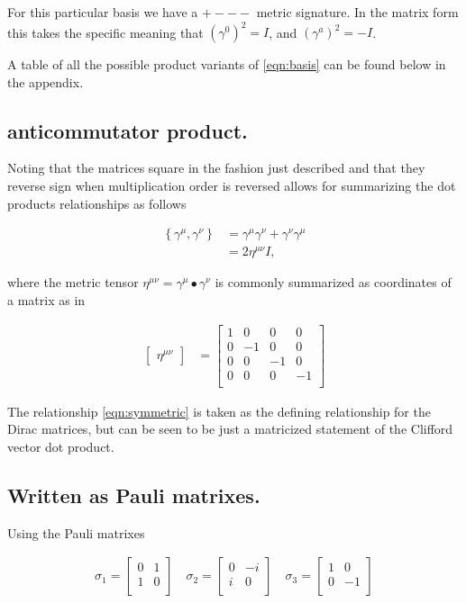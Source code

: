 \documentclass{article}
\newcommand{\scalarProduct}[2]{{#1} \bullet {#2}}
\newcommand{\symmetric}[2]{{\left\{{#1},{#2}\right\}}}
\newcommand{\PauliX}[0]{
\begin{bmatrix}
0 & 1 \\
1 & 0 \\
\end{bmatrix}
}
\newcommand{\PauliY}[0]{
\begin{bmatrix}
0 & -i \\
i & 0 \\
\end{bmatrix}
}
\newcommand{\PauliZ}[0]{
\begin{bmatrix}
1 & 0 \\
0 & -1 \\
\end{bmatrix}
}
\begin{document}
For this particular basis we have a $+---$ metric signature.  In the matrix form this takes the specific meaning that $(\gamma^0)^2 = I$, and $(\gamma^a)^2 = -I$.

A table of all the possible product variants of \ref{eqn:basis} can be found below in the appendix.

\subsection{ anticommutator product. }

Noting that the matrices square in the fashion just described and that they reverse sign when multiplication order is reversed allows for summarizing the dot products relationships as follows

\begin{align}\label{eqn:symmetric}
\symmetric{\gamma^\mu}{\gamma^\nu} 
&= {\gamma^\mu}{\gamma^\nu} + {\gamma^\nu}{\gamma^\mu} \\
&= 2 \eta^{\mu\nu} I,
\end{align}

where the metric tensor $\eta^{\mu\nu} = \scalarProduct{\gamma^\mu}{\gamma^\nu}$ is commonly summarized as coordinates of a matrix as in

\begin{align*}
\begin{bmatrix}
\eta^{\mu\nu}
\end{bmatrix}
&=
\begin{bmatrix}
1 & 0 & 0 & 0 \\
0 & -1 & 0 & 0 \\
0 & 0 & -1 & 0 \\
0 & 0 & 0 & -1 \\
\end{bmatrix}
\end{align*}

The relationship \ref{eqn:symmetric} is taken as the defining relationship for the Dirac matrices, but can be seen to be just a matricized statement of the Clifford vector dot product.

\subsection{ Written as Pauli matrixes. }

Using the Pauli matrixes

\begin{align}
\sigma_1 = \PauliX \quad \sigma_2 = \PauliY \quad \sigma_3 = \PauliZ
\end{align}
\end{document}
